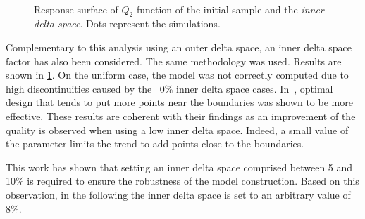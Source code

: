 \begin{figure}[ht]               
\centering
{}
 ~       
\caption{Response surface of $Q_2$ function of the initial sample and the \textit{inner delta space}. Dots represent the simulations.}
\label{fig:inner-delta}
\end{figure}

Complementary to this analysis using an outer delta space, an inner delta space factor has also been considered. The same methodology was used. Results are shown in \cref{fig:inner-delta}. On the uniform case, the model was not correctly computed due to high discontinuities caused by the ~0\% inner delta space cases. In~\cite{dette2010}, optimal design that tends to put more points near the boundaries was shown to be more effective. These results are coherent with their findings as an improvement of the quality is observed when using a low inner delta space. Indeed, a small value of the parameter limits the trend to add points close to the boundaries.

This work has shown that setting an inner delta space comprised between 5 and 10\% is required to ensure the robustness of the model construction. Based on this observation, in the following the inner delta space is set to an arbitrary value of 8\%.

